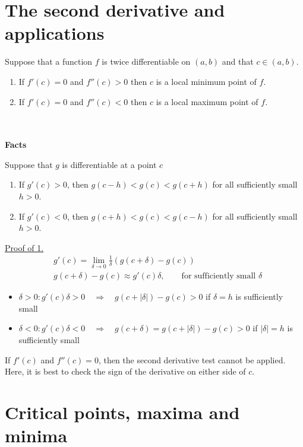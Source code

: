 \documentclass{report}
\begin{document}
	\section{The second derivative and applications}

		Suppose that a function $f$ is twice differentiable on $(a,b)$ and that $c \in (a,b)$.
		\begin{enumerate}
			\item If $f'(c) = 0$ and $f''(c) > 0$ then $c$ is a local minimum point of $f$.
			\item If $f'(c) = 0$ and $f''(c) < 0$ then $c$ is a local maximum point of $f$.
		\end{enumerate}
		\\ \\

		\textbf{Facts}

			Suppose that $g$ is differentiable at a point $c$
			\begin{enumerate}
				\item If $g'(c) > 0$, then $g(c-h) < g(c) < g(c+h)$ for all sufficiently small $h > 0$.
				\item If $g'(c) < 0$, then $g(c+h) < g(c) < g(c-h)$ for all sufficiently small $h > 0$.
			\end{enumerate}

		\underline{Proof of 1.}
			\begin{align*}
				& g'(c) = \lim_{\delta\to 0} \frac{1}{\delta} \left(g(c+\delta) - g(c)\right)		\\
				& g(c+\delta) - g(c) \approx g'(c)\delta,\qquad \text{for sufficiently small }\delta
			\end{align*}
			\begin{itemize}
				\item $\delta > 0: g'(c) \delta > 0 \quad \Rightarrow \quad g(c+|\delta|) - g(c) > 0$ if $\delta = h$ is sufficiently small
				\item $\delta < 0: g'(c) \delta < 0 \quad \Rightarrow \quad g(c+\delta) = g(c+|\delta|) - g(c) > 0$ if $|\delta| = h$ is sufficiently small
			\end{itemize}

		If $f'(c)$ and $f''(c) = 0$, then the second derivative test cannot be applied. Here, it is best to check the sign of the derivative on either side of $c$.

	\section{Critical points, maxima and minima}
\end{document}
